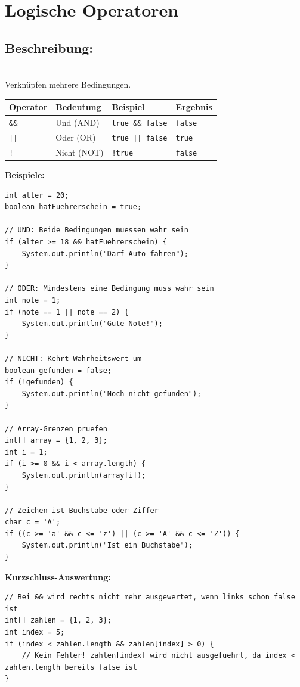 \newpage


\section*{Logische Operatoren}

\subsection*{Beschreibung:}\\
Verknüpfen mehrere Bedingungen.

\begin{center}
\begin{tabular}{|l|l|l|l|}
\hline
\textbf{Operator} & \textbf{Bedeutung} & \textbf{Beispiel} & \textbf{Ergebnis} \\
\hline
\texttt{\&\&} & Und (AND) & \texttt{true \&\& false} & \texttt{false} \\
\hline
\texttt{||} & Oder (OR) & \texttt{true || false} & \texttt{true} \\
\hline
\texttt{!} & Nicht (NOT) & \texttt{!true} & \texttt{false} \\
\hline
\end{tabular}
\end{center}

\textbf{Beispiele:}
\begin{lstlisting}
int alter = 20;
boolean hatFuehrerschein = true;

// UND: Beide Bedingungen muessen wahr sein
if (alter >= 18 && hatFuehrerschein) {
    System.out.println("Darf Auto fahren");
}

// ODER: Mindestens eine Bedingung muss wahr sein
int note = 1;
if (note == 1 || note == 2) {
    System.out.println("Gute Note!");
}

// NICHT: Kehrt Wahrheitswert um
boolean gefunden = false;
if (!gefunden) {
    System.out.println("Noch nicht gefunden");
}

// Array-Grenzen pruefen
int[] array = {1, 2, 3};
int i = 1;
if (i >= 0 && i < array.length) {
    System.out.println(array[i]);
}

// Zeichen ist Buchstabe oder Ziffer
char c = 'A';
if ((c >= 'a' && c <= 'z') || (c >= 'A' && c <= 'Z')) {
    System.out.println("Ist ein Buchstabe");
}
\end{lstlisting}

\textbf{Kurzschluss-Auswertung:}
\begin{lstlisting}
// Bei && wird rechts nicht mehr ausgewertet, wenn links schon false ist
int[] zahlen = {1, 2, 3};
int index = 5;
if (index < zahlen.length && zahlen[index] > 0) {
    // Kein Fehler! zahlen[index] wird nicht ausgefuehrt, da index < zahlen.length bereits false ist
}
\end{lstlisting}


